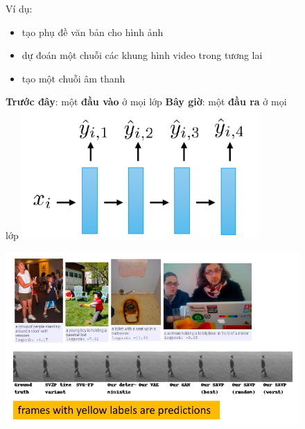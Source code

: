\documentclass{book}
\begin{document}
\begin{figure}[H]
    \centering
    \begin{minipage}[c]{0.35\textwidth}
        Ví dụ:
        \begin{itemize}
            \item[] tạo phụ đề văn bản cho hình ảnh
            \item[] dự đoán một chuỗi các khung hình video trong tương lai
            \item[] tạo một chuỗi âm thanh
        \end{itemize}
        \textbf{Trước đây}: một \textbf{đầu vào} ở mọi lớp
        \textbf{Bây giờ}: một \textbf{đầu ra} ở mọi lớp
        \includegraphics[width=0.8\textwidth]{images/what_if_we_have_variable_size_outputs.png}
    \end{minipage}\hfill
    \begin{minipage}[c]{0.65\textwidth}
        \centering
        \includegraphics[width=\textwidth]{images/what_if_we_have_variable_size_outputs_2.png}
    \end{minipage}
\end{figure}
\end{document}
